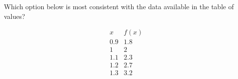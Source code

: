\documentclass{ximera}
\author{Steven Gubkin}
\begin{document}
\begin{exercise}

Which option below is most consistent with the data available in the table of values?

\[
\begin{array}{c|c}
 x & f(x)\\ \hline
0.9 & 1.8\\ 
 1 & 2\\ 
 1.1 & 2.3\\
 1.2 & 2.7\\ 
 1.3 & 3.2\\ 
\end{array}
\]

\begin{multipleChoice}
\end{multipleChoice}

\end{exercise}
\end{document}
